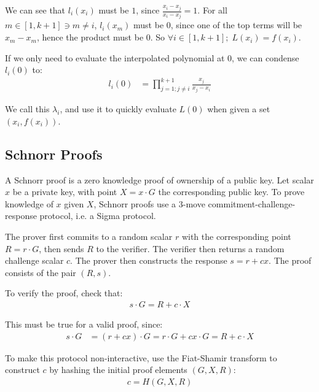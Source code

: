 \documentclass{article}
\theoremstyle{plain}
\theoremstyle{definition}
\theoremstyle{remark}
\begin{document}
We can see that $l_i(x_i)$ must be $1$, since $\frac{x_i - x_j}{x_i - x_j} = 1$.  For all $m \in [1, k+1] \ni m \neq i$, $l_i(x_m)$ must be $0$, since one of the top terms will be $x_m - x_m$, hence the product must be $0$.  So $\forall i \in [1,k+1];\; L(x_i) = f(x_i)$.

If we only need to evaluate the interpolated polynomial at $0$, we can condense $l_i(0)$ to:
\begin{align}
  l_i(0) &= \prod_{j=1; j \neq i}^{k+1} \frac{x_j}{x_j - x_i}
\end{align}

We call this $\lambda_i$, and use it to quickly evaluate $L(0)$ when given a set $(x_i, f(x_i))$.

\newpage
\onecolumn

\subsection{
  Schnorr Proofs
}\label{section:schnorr}

A Schnorr proof \cite{schnorr} is a zero knowledge proof of ownership of a public key.  Let scalar $x$ be a private key, with point $X = x \cdot G$ the corresponding public key.  To prove knowledge of $x$ given $X$, Schnorr proofs use a $3$-move commitment-challenge-response protocol, i.e. a Sigma protocol.

The prover first commits to a random scalar $r$ with the corresponding point $R = r \cdot G$, then sends $R$ to the verifier.  The verifier then returns a random challenge scalar $c$.  The prover then constructs the response $s = r + cx$.  The proof consists of the pair $(R, s)$.

To verify the proof, check that:
\begin{align}\label{equation:schnorr-verify}
  s \cdot G = R + c \cdot X
\end{align}

This must be true for a valid proof, since:
\begin{align}
  s \cdot G &= (r + cx) \cdot G = r \cdot G + cx \cdot G = R + c \cdot X\nonumber
\end{align}

To make this protocol non-interactive, use the Fiat-Shamir transform \cite{fiatshamir} to construct $c$ by hashing the initial proof elements $(G, X, R)$:
\begin{align}\label{equation:schnorr-challenge}
  c = H(G, X, R)
\end{align}
\end{document}

